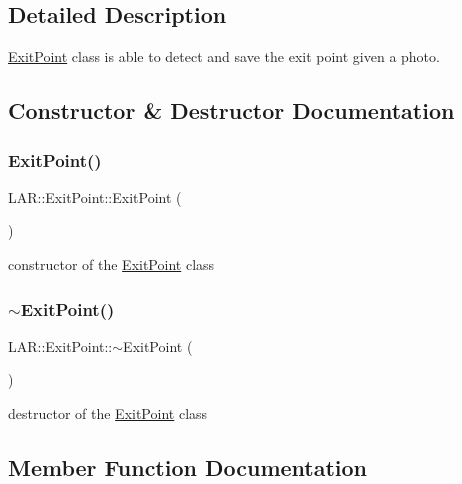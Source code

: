 \subsection{Detailed Description}
\mbox{\hyperlink{class_l_a_r_1_1_exit_point}{Exit\+Point}} class is able to detect and save the exit point given a photo. 

\subsection{Constructor \& Destructor Documentation}
\mbox{\label{class_l_a_r_1_1_exit_point_a832d0cb82dbbf3654605611fcccf0410}} 
\subsubsection{\texorpdfstring{Exit\+Point()}{ExitPoint()}}
{\footnotesize\ttfamily L\+A\+R\+::\+Exit\+Point\+::\+Exit\+Point (\begin{DoxyParamCaption}{ }\end{DoxyParamCaption})}

constructor of the \mbox{\hyperlink{class_l_a_r_1_1_exit_point}{Exit\+Point}} class \mbox{\label{class_l_a_r_1_1_exit_point_a1251666aa7cb325b370a69bf9a72272a}} 
\subsubsection{\texorpdfstring{$\sim$\+Exit\+Point()}{~ExitPoint()}}
{\footnotesize\ttfamily L\+A\+R\+::\+Exit\+Point\+::$\sim$\+Exit\+Point (\begin{DoxyParamCaption}{ }\end{DoxyParamCaption})}

destructor of the \mbox{\hyperlink{class_l_a_r_1_1_exit_point}{Exit\+Point}} class 

\subsection{Member Function Documentation}
\mbox{\label{class_l_a_r_1_1_exit_point_a1f76dfc40d2803181e33ffe5e412f592}} 
